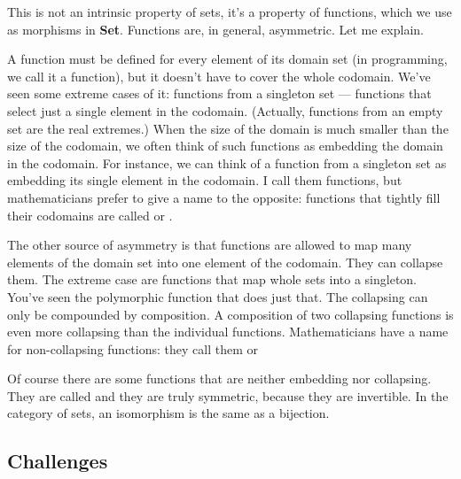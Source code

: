 This is not an intrinsic property of sets, it's a property of functions,
which we use as morphisms in \textbf{Set}. Functions are, in general,
asymmetric. Let me explain.

A function must be defined for every element of its domain set (in
programming, we call it a  function), but it doesn't have to
cover the whole codomain. We've seen some extreme cases of it: functions
from a singleton set --- functions that select just a single element in
the codomain. (Actually, functions from an empty set are the real
extremes.) When the size of the domain is much smaller than the size of
the codomain, we often think of such functions as embedding the domain
in the codomain. For instance, we can think of a function from a
singleton set as embedding its single element in the codomain. I call
them  functions, but mathematicians prefer to give a
name to the opposite: functions that tightly fill their codomains are
called  or .

The other source of asymmetry is that functions are allowed to map many
elements of the domain set into one element of the codomain. They can
collapse them. The extreme case are functions that map whole sets into a
singleton. You've seen the polymorphic  function that does
just that. The collapsing can only be compounded by composition. A
composition of two collapsing functions is even more collapsing than the
individual functions. Mathematicians have a name for non-collapsing
functions: they call them  or 

Of course there are some functions that are neither embedding nor
collapsing. They are called  and they are truly
symmetric, because they are invertible. In the category of sets, an
isomorphism is the same as a bijection.

\subsection{Challenges}\label{challenges}

